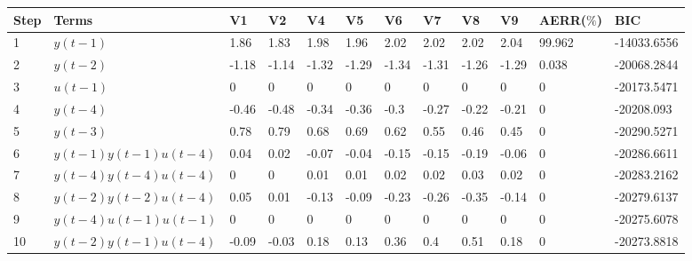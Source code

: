 \begin{tabular}{llllllllllll}
Step & Terms & V1 & V2 & V4 & V5 & V6 & V7 & V8 & V9 & AERR($\%$) & BIC \\ 
\hline 
1 & $y(t-1)$ & 1.86 & 1.83 & 1.98 & 1.96 & 2.02 & 2.02 & 2.02 & 2.04 & 99.962 & -14033.6556 \\ 
2 & $y(t-2)$ & -1.18 & -1.14 & -1.32 & -1.29 & -1.34 & -1.31 & -1.26 & -1.29 & 0.038 & -20068.2844 \\ 
3 & $u(t-1)$ & 0 & 0 & 0 & 0 & 0 & 0 & 0 & 0 & 0 & -20173.5471 \\ 
4 & $y(t-4)$ & -0.46 & -0.48 & -0.34 & -0.36 & -0.3 & -0.27 & -0.22 & -0.21 & 0 & -20208.093 \\ 
5 & $y(t-3)$ & 0.78 & 0.79 & 0.68 & 0.69 & 0.62 & 0.55 & 0.46 & 0.45 & 0 & -20290.5271 \\ 
6 & $y(t-1)y(t-1)u(t-4)$ & 0.04 & 0.02 & -0.07 & -0.04 & -0.15 & -0.15 & -0.19 & -0.06 & 0 & -20286.6611 \\ 
7 & $y(t-4)y(t-4)u(t-4)$ & 0 & 0 & 0.01 & 0.01 & 0.02 & 0.02 & 0.03 & 0.02 & 0 & -20283.2162 \\ 
8 & $y(t-2)y(t-2)u(t-4)$ & 0.05 & 0.01 & -0.13 & -0.09 & -0.23 & -0.26 & -0.35 & -0.14 & 0 & -20279.6137 \\ 
9 & $y(t-4)u(t-1)u(t-1)$ & 0 & 0 & 0 & 0 & 0 & 0 & 0 & 0 & 0 & -20275.6078 \\ 
10 & $y(t-2)y(t-1)u(t-4)$ & -0.09 & -0.03 & 0.18 & 0.13 & 0.36 & 0.4 & 0.51 & 0.18 & 0 & -20273.8818 \\ 
\hline 
\end{tabular}